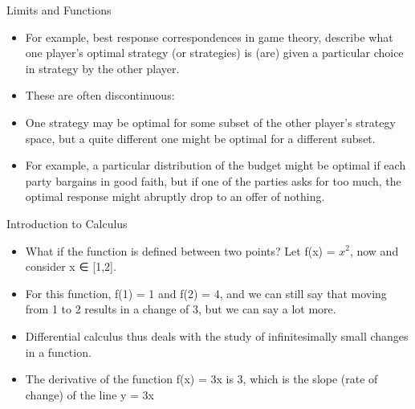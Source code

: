 \documentclass[
  ignorenonframetext,
]{beamer}
\begin{document}
\begin{frame}{Limits and Functions}
\protect\hypertarget{limits-and-functions-2}{}

\begin{itemize}
\item
  For example, best response correspondences in game theory, describe
  what one player's optimal strategy (or strategies) is (are) given a
  particular choice in strategy by the other player.
\item
  These are often discontinuous:
\item
  One strategy may be optimal for some subset of the other player's
  strategy space, but a quite different one might be optimal for a
  different subset.
\item
  For example, a particular distribution of the budget might be optimal
  if each party bargains in good faith, but if one of the parties asks
  for too much, the optimal response might abruptly drop to an offer of
  nothing.
\end{itemize}

\end{frame}

\begin{frame}{Introduction to Calculus}
\protect\hypertarget{introduction-to-calculus}{}

\begin{itemize}
\item
  What if the function is defined between two points? Let f(x) =
  \(x^{2}\), now and consider x ∈ {[}1,2{]}.
\item
  For this function, f(1) = 1 and f(2) = 4, and we can still say that
  moving from 1 to 2 results in a change of 3, but we can say a lot
  more.
\item
  Differential calculus thus deals with the study of infinitesimally
  small changes in a function.
\item
  The derivative of the function f(x) = 3x is 3, which is the slope
  (rate of change) of the line y = 3x
\end{itemize}

\end{frame}
\end{document}
